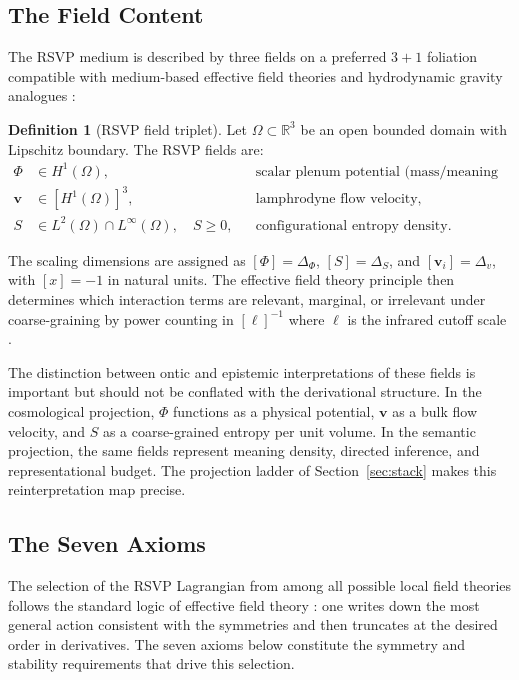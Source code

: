\documentclass[12pt, a4paper]{article}
\theoremstyle{plain}
\theoremstyle{definition}
\newtheorem{definition}[theorem]{Definition}
\theoremstyle{remark}
\newcommand{\vfield}{\mathbf{v}}
\begin{document}
\subsection{The Field Content}

The RSVP medium is described by three fields on a preferred $3+1$ foliation compatible
with medium-based effective field theories \cite{Andersson2007} and hydrodynamic gravity
analogues \cite{Barcelo2005}:

\begin{definition}[RSVP field triplet]
Let $\Omega \subset \mathbb{R}^3$ be an open bounded domain with Lipschitz boundary.
The RSVP fields are:
\begin{align}
\Phi &\in H^1(\Omega), && \text{scalar plenum potential (mass/meaning density),}\\
\vfield &\in [H^1(\Omega)]^3, && \text{lamphrodyne flow velocity,}\\
S &\in L^2(\Omega) \cap L^\infty(\Omega),\quad S\geq 0, && \text{configurational entropy density.}
\end{align}
\end{definition}

The scaling dimensions are assigned as $[\Phi] = \Delta_\Phi$, $[S] = \Delta_S$, and
$[\vfield_i] = \Delta_v$, with $[x] = -1$ in natural units.  The effective field theory
principle then determines which interaction terms are relevant, marginal, or irrelevant
under coarse-graining by power counting in $[\ell]^{-1}$ where $\ell$ is the infrared
cutoff scale \cite{Weinberg1995, Cheung2008}.

The distinction between ontic and epistemic interpretations of these fields is important
but should not be conflated with the derivational structure.  In the cosmological
projection, $\Phi$ functions as a physical potential, $\vfield$ as a bulk flow velocity,
and $S$ as a coarse-grained entropy per unit volume.  In the semantic projection, the
same fields represent meaning density, directed inference, and representational budget.
The projection ladder of Section~\ref{sec:stack} makes this reinterpretation map
precise.

\subsection{The Seven Axioms}

The selection of the RSVP Lagrangian from among all possible local field theories follows
the standard logic of effective field theory \cite{Weinberg1995}: one writes down the
most general action consistent with the symmetries and then truncates at the desired order
in derivatives.  The seven axioms below constitute the symmetry and stability requirements
that drive this selection.
\end{document}
